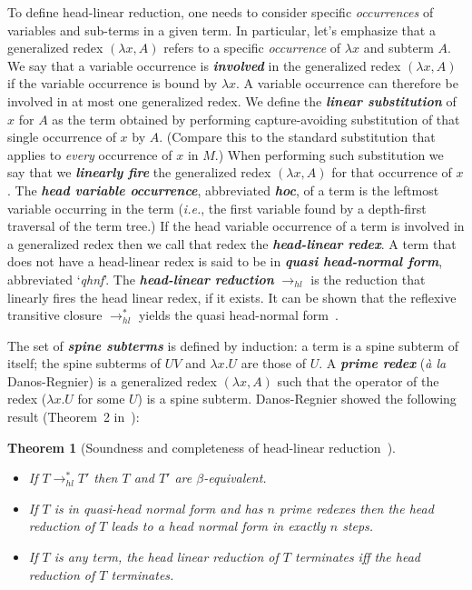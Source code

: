 \documentclass[xchauthor,chkrefs,GCNS,amsmath,amsthm,rotating,leaveRGB]{tcsg}
\renewcommand{\index}[1]{}
\theoremstyle{plain}
\newtheorem{theorem}{Theorem}[section]
\theoremstyle{definition}
\newcommand{\hlred}{\rightarrow_{hl}}
\begin{document}
To define head-linear reduction, one needs to consider specific
\emph{occurrences} of variables and sub-terms in a given term. In particular,
let's emphasize that a generalized redex  $(\lambda x, A)$ refers to a
specific \emph{occurrence} of $\lambda x$ and subterm $A$. We say that a
variable occurrence is \textbf{\emph{involved}}\index{involved} in the
generalized redex $(\lambda x, A)$ if the variable occurrence is bound by
$\lambda x$. A variable occurrence can therefore be involved in at most one
generalized redex. We define the \textbf{\emph{linear
substitution}}\index{linear substitution} of $x$ for $A$ as the term obtained
by performing capture-avoiding substitution of that single occurrence of $x$
by $A$. (Compare this to the standard substitution that applies to
\emph{every} occurrence of $x$ in $M$.) When performing such substitution we
say that we \textbf{\emph{linearly fire}}\index{linearly fire} the
generalized redex $(\lambda x, A)$ for that occurrence of $x$. The
\textbf{\emph{head variable occurrence}}\index{head variable occurrence},
abbreviated \textbf{\emph{hoc}}\index{hoc}, of a term is the leftmost
variable occurring in the term (\textit{i.e.}, the first variable found by a
depth-first traversal of the term tree.) If the head variable occurrence of a
term is involved in a generalized redex then we call that redex the
\textbf{\emph{head-linear redex}}\index{head-linear redex}. A term that does
not have a head-linear redex is said to be in \textbf{\emph{quasi head-normal
form}}\index{quasi head-normal form}, abbreviated `\emph{qhnf}'. The
\textbf{\emph{head-linear reduction}}\index{head-linear reduction} $\hlred $
is the reduction that linearly fires the head linear redex, if it exists. It
can be shown that the reflexive transitive closure $\rightarrow ^{*}_{hl}$
yields the quasi head-normal form~\cite{danos-head,danosherbelinregnier1996}.

The set of \textbf{\emph{spine subterms}}\index{spine subterms} is defined by
induction: a term is a spine subterm of itself; the spine subterms of $U V$
and $\lambda x. U$ are those of $U$. A \textbf{\emph{prime
redex}}\index{prime redex} (\emph{\`{a} la} Danos-Regnier) is a generalized
redex $(\lambda x, A)$ such that the operator of the redex ($\lambda x . U$
for some $U$) is a spine subterm. Danos-Regnier showed the following result
(Theorem~2 in~\cite{danos-head}):

\begin{theorem}[Soundness and completeness of head-linear reduction~\cite{danos-head}]\label{thm:danosregnier_headlinred}
%
\begin{itemize}
\item If $T \rightarrow ^{*}_{hl} T'$  then $T$ and $T'$ are $\beta
    $-equivalent.
\item If $T$ is in quasi-head normal form and has $n$ prime redexes then
    the head reduction of $T$ leads to a head normal form in exactly $n$
    steps.
\item If $T$ is any term, the head linear reduction of $T$ terminates iff
    the head reduction of $T$ terminates.
\end{itemize}
\end{theorem}
\end{document}
